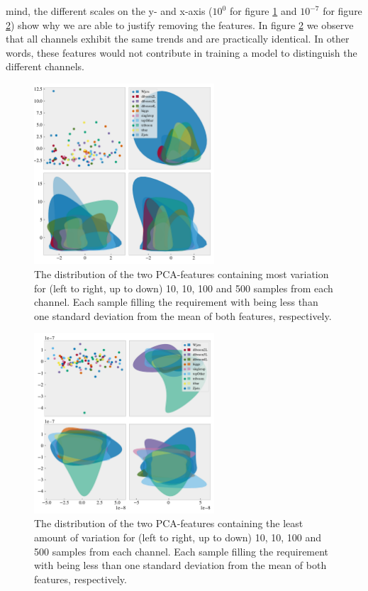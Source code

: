mind, the different scales on the y- and x-axis ($10^0$ for figure \ref{fig:PCA1} and $10^{-7}$ for figure 
\ref{fig:PCA2}) show why we are able to justify removing the features. In figure \ref{fig:PCA2} we observe 
that all channels exhibit the same trends and are practically identical. In other words, these features 
would not contribute in training a model to distinguish the different channels.
\begin{figure}
    \centering
    \includegraphics[width=0.6\textwidth]{Figures/MLResults/DataHandling/PCA/PCAPlotFirst.pdf}
    \caption{The distribution of the two PCA-features containing most variation for (left to right, 
    up to down) 10, 10, 100 and 500 samples from each channel. Each sample filling the requirement 
    with being less than one standard deviation from the mean of both features, respectively.}
    \label{fig:PCA1}
\end{figure}
\begin{figure}
    \centering
    \includegraphics[width=0.6\textwidth]{Figures/MLResults/DataHandling/PCA/PCAPlotLast.pdf}
    \caption{The distribution of the two PCA-features containing the least amount of variation for (left to right, 
    up to down) 10, 10, 100 and 500 samples from each channel. Each sample filling the requirement 
    with being less than one standard deviation from the mean of both features, respectively.}
    \label{fig:PCA2}
\end{figure}


